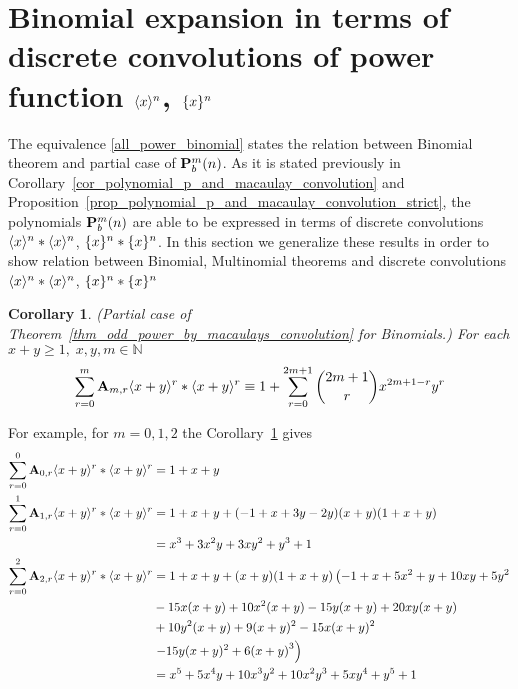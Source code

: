 \documentclass[12pt,letterpaper,oneside,reqno]{amsart}
\newcommand \anglePower [2]{\langle #1 \rangle \sp{#2}}
\newcommand \curvePower [2]{\{#1\}\sp{#2}}
\newcommand \coeffA [3][A] {{\mathbf{#1}} \sb{#2,#3}}
\newcommand \polynomialP [4][P]{{\mathbf{#1}}\sp{#2} \sb{#3}(#4)}
\newtheorem{cor}[thm]{Corollary}
\numberwithin{equation}{section}
\begin{document}
    \section{Binomial expansion in terms of discrete convolutions of power function
        \texorpdfstring{$\anglePower{x}{n}$}{<x to pow n>}, \texorpdfstring{$\curvePower{x}{n}$}{\{x to pow n\}}}
    The equivalence \eqref{all_power_binomial} states the relation between Binomial theorem and partial case
    of $\polynomialP{m}{b}{n}$.
    As it is stated previously in Corollary~\ref{cor_polynomial_p_and_macaulay_convolution} and
    Proposition~\ref{prop_polynomial_p_and_macaulay_convolution_strict}, the polynomials $\polynomialP{m}{b}{n}$
    are able to be expressed in terms of discrete convolutions $\anglePower{x}{n} \ast \anglePower{x}{n}$,
    $\curvePower{x}{n} \ast \curvePower{x}{n}$.
    In this section we generalize these results in order to show relation between Binomial, Multinomial theorems and
    discrete convolutions $\anglePower{x}{n} \ast \anglePower{x}{n}$, $\curvePower{x}{n} \ast \curvePower{x}{n}$
    \begin{cor}
        \label{cor_bin_exp_and_macaulay_conv}
        (Partial case of Theorem~\ref{thm_odd_power_by_macaulays_convolution} for Binomials.)
        For each $x+y\geq 1, \; x,y,m\in\mathbb{N}$
        \begin{equation*}
            \sum_{r=0}^{m} \coeffA{m}{r} \anglePower{x+y}{r} \ast \anglePower{x+y}{r}
            \equiv
            1 + \sum_{r=0}^{2m+1} \binom{2m+1}{r} x^{2m+1-r} y^r
        \end{equation*}
    \end{cor}
    For example, for $m=0,1,2$ the Corollary~\ref{cor_bin_exp_and_macaulay_conv} gives
    \begin{equation*}
        \begin{split}
            \sum_{r=0}^{0} \coeffA{0}{r} \anglePower{x+y}{r} \ast \anglePower{x+y}{r}
            &= 1 + x + y \\
            \sum_{r=0}^{1} \coeffA{1}{r} \anglePower{x+y}{r} \ast \anglePower{x+y}{r}
            &= 1 + x + y + (-1 + x + 3 y - 2 y) (x + y) (1 + x + y) \\
            &= x^3 + 3 x^2 y + 3 x y^2 + y^3 + 1\\
            \sum_{r=0}^{2} \coeffA{2}{r} \anglePower{x+y}{r} \ast \anglePower{x+y}{r}
            &=1 + x + y + (x + y) (1 + x + y) \left(-1 + x + 5 x^2 + y + 10 x y + 5 y^2\right. \\
            &-15 x (x + y) + 10 x^2 (x + y) - 15 y (x + y) + 20 x y (x + y) \\
            &+ 10 y^2 (x + y) +9 (x + y)^2 - 15 x (x + y)^2 \\
            &\left.-15 y (x + y)^{2} + 6 {(x + y)}^{3}\right) \\
            &=x^5 + 5 x^4 y + 10 x^3 y^2 + 10 x^2 y^3 + 5 x y^4 + y^5 + 1
        \end{split}
    \end{equation*}
\end{document}
